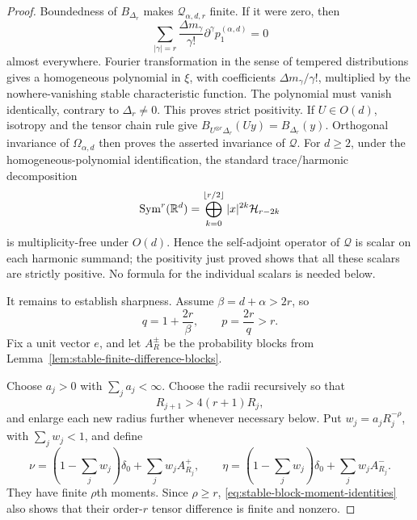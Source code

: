 \begin{proof}
Boundedness of \(B_{\Delta_r}\) makes
\(\mathcal Q_{\alpha,d,r}\) finite.  If it were zero, then
\[
 \sum_{|\gamma|=r}\frac{\Delta m_\gamma}{\gamma!}
 \partial^\gamma p_1^{(\alpha,d)}=0
\]
almost everywhere.  Fourier transformation in the sense of tempered
distributions gives a homogeneous polynomial in \(\xi\), with coefficients
\(\Delta m_\gamma/\gamma!\), multiplied by the nowhere-vanishing stable
characteristic function.  The polynomial must vanish identically, contrary
to \(\Delta_r\ne0\).  This proves strict positivity.  If \(U\in O(d)\),
isotropy and the tensor chain rule give
\(B_{U^{\otimes r}\Delta_r}(Uy)=B_{\Delta_r}(y)\).  Orthogonal invariance of
\(\Omega_{\alpha,d}\) then proves the asserted invariance of \(\mathcal Q\).
For \(d\ge2\), under the homogeneous-polynomial identification, the standard
trace/harmonic decomposition
\[
 \operatorname{Sym}^r(\mathbb{R}^d)
 =\bigoplus_{k=0}^{\lfloor r/2\rfloor}
   |x|^{2k}\mathcal H_{r-2k}
\]
is multiplicity-free under \(O(d)\).  Hence the self-adjoint operator of
\(\mathcal Q\) is scalar on each harmonic summand; the positivity just proved
shows that all these scalars are strictly positive.  No formula for the
individual scalars is needed below.

It remains to establish sharpness.  Assume \(\beta=d+\alpha>2r\), so
\[
 q=1+\frac{2r}{\beta},\qquad p=\frac{2r}{q}>r.
\]
Fix a unit vector \(e\), and let \(A_R^\pm\) be the probability blocks from
Lemma~\ref{lem:stable-finite-difference-blocks}.

Choose \(a_j>0\) with \(\sum_ja_j<\infty\).  Choose the radii recursively so
that
\begin{equation}\label{eq:all-order-separated-block-radii}
 R_{j+1}>4(r+1)R_j,
\end{equation}
and enlarge each new radius further whenever necessary below.  Put
\(w_j=a_jR_j^{-\rho}\), with \(\sum_jw_j<1\), and define
\[
 \nu=\left(1-\sum_jw_j\right)\delta_0+\sum_jw_jA_{R_j}^+,
 \qquad
 \eta=\left(1-\sum_jw_j\right)\delta_0+\sum_jw_jA_{R_j}^-.
\]
They have finite \(\rho\)th moments.  Since \(\rho\ge r\),
\eqref{eq:stable-block-moment-identities} also shows that their
order-\(r\) tensor difference is finite and nonzero.


\end{proof}
